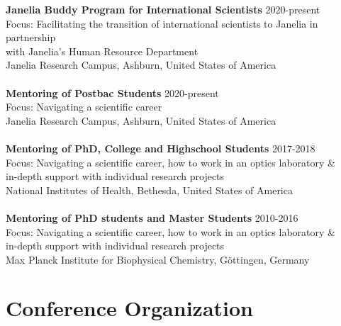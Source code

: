 \documentclass[margin,line]{res}
\begin{document}
\begin{resume}
{\bf  Janelia Buddy Program for International Scientists} \hfill 2020-present\\
Focus: Facilitating the transition of international scientists to Janelia in partnership \\
with Janelia's Human Resource Department\\
Janelia Research Campus, Ashburn, United States of America\\
\vspace*{-3mm}\\
{\bf  Mentoring of Postbac Students} \hfill 2020-present\\
Focus: Navigating a scientific career\\
Janelia Research Campus, Ashburn, United States of America\\
\vspace*{-3mm}\\
{\bf  Mentoring of PhD, College and Highschool Students}  \hfill 2017-2018\\
Focus: Navigating a scientific career, how to work in an optics laboratory \&\\
in-depth support with individual research projects\\
National Institutes of Health, Bethesda, United States of America\\
\vspace*{-3mm}\\
{\bf Mentoring of PhD students and Master Students}  \hfill {2010-2016}\\
Focus: Navigating a scientific career, how to work in an optics laboratory \&\\
in-depth support with individual research projects\\
Max Planck Institute for Biophysical Chemistry, Göttingen, Germany \\


\section{\sc Conference Organization}


\end{resume}
\end{document}
